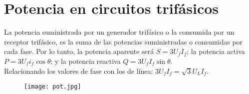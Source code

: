 \documentclass[a4paper,12pt]{report}
\begin{document}
\chapter{Potencia en circuitos trifásicos}
La potencia suministrada por un generador trifásico o la consumida por un receptor trifásico, es la suma de las potencias suministradas o consumidas por cada fase. Por lo tanto, la potencia aparente será $S = 3U_{f}I_{f}$; la potencia activa $P = 3U_{f}i_{f}\cos \theta$; y la potencia reactiva $Q = 3U_{f}I_{f}\sin \theta$.\\
Relacionando los valores de fase con los de línea: $3U_{f}I_{f} = \sqrt{3}U_{L}I_{f}$.
\begin{figure}[H]
\centering
\texttt{[image: pot.jpg]}
\end{figure}
\begin{thebibliography}{99}  %

\end{thebibliography}
\end{document}
